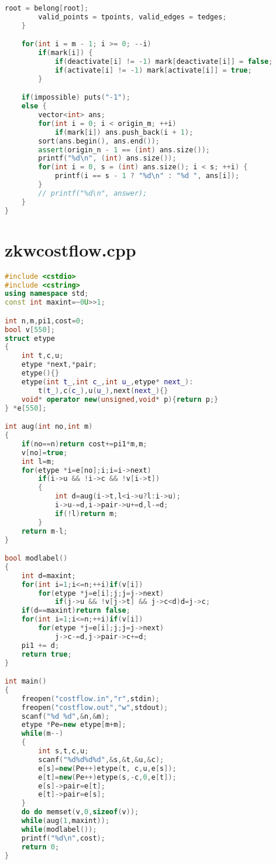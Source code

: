 \begin{lstlisting}[language=c++]
		root = belong[root];
		valid_points = tpoints, valid_edges = tedges;
	}

	for(int i = m - 1; i >= 0; --i)
		if(mark[i]) {
			if(deactivate[i] != -1) mark[deactivate[i]] = false;
			if(activate[i] != -1) mark[activate[i]] = true;
		}

    if(impossible) puts("-1");
    else {
        vector<int> ans;
        for(int i = 0; i < origin_m; ++i)
            if(mark[i]) ans.push_back(i + 1);
        sort(ans.begin(), ans.end());
        assert(origin_n - 1 == (int) ans.size());
        printf("%d\n", (int) ans.size());
        for(int i = 0, s = (int) ans.size(); i < s; ++i) {
            printf(i == s - 1 ? "%d\n" : "%d ", ans[i]);
        }
        // printf("%d\n", answer);
    }
}

\end{lstlisting}
\section{zkwcostflow.cpp}
\begin{lstlisting}[language=c++]
#include <cstdio>
#include <cstring>
using namespace std;
const int maxint=~0U>>1;

int n,m,pi1,cost=0;
bool v[550];
struct etype
{
    int t,c,u;
    etype *next,*pair;
    etype(){}
    etype(int t_,int c_,int u_,etype* next_):
        t(t_),c(c_),u(u_),next(next_){}
    void* operator new(unsigned,void* p){return p;}
} *e[550];

int aug(int no,int m)
{
    if(no==n)return cost+=pi1*m,m;
    v[no]=true;
    int l=m;
    for(etype *i=e[no];i;i=i->next)
        if(i->u && !i->c && !v[i->t])
        {
            int d=aug(i->t,l<i->u?l:i->u);
            i->u-=d,i->pair->u+=d,l-=d;
            if(!l)return m;
        }
    return m-l;
}

bool modlabel()
{
    int d=maxint;
    for(int i=1;i<=n;++i)if(v[i])
        for(etype *j=e[i];j;j=j->next)
            if(j->u && !v[j->t] && j->c<d)d=j->c;
    if(d==maxint)return false;
    for(int i=1;i<=n;++i)if(v[i])
        for(etype *j=e[i];j;j=j->next)
            j->c-=d,j->pair->c+=d;
    pi1 += d;
    return true;
}

int main()
{
    freopen("costflow.in","r",stdin);
    freopen("costflow.out","w",stdout);
    scanf("%d %d",&n,&m);
    etype *Pe=new etype[m+m];
    while(m--)
    {
        int s,t,c,u;
        scanf("%d%d%d%d",&s,&t,&u,&c);
        e[s]=new(Pe++)etype(t, c,u,e[s]);
        e[t]=new(Pe++)etype(s,-c,0,e[t]);
        e[s]->pair=e[t];
        e[t]->pair=e[s];
    }
    do do memset(v,0,sizeof(v));
    while(aug(1,maxint));
    while(modlabel());
    printf("%d\n",cost);
    return 0;
}

\end{lstlisting}
